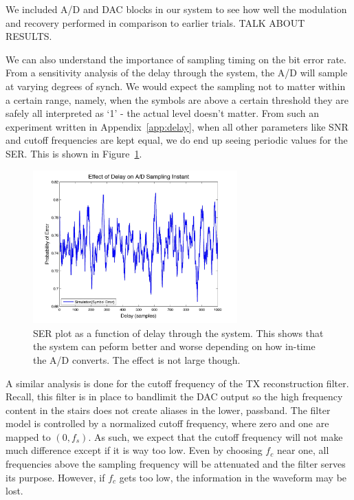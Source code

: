 \documentclass[]{article}
\begin{document}
We included A/D and DAC blocks in our system to see how well the modulation and recovery performed in comparison to earlier trials.  TALK ABOUT RESULTS.

We can also understand the importance of sampling timing on the bit error rate.  From a sensitivity analysis of the delay through the system, the A/D will sample at varying degrees of synch.  We would expect the sampling not to matter within a certain range, namely, when the symbols are above a certain threshold they are safely all interpreted as `1' - the actual level doesn't matter.  From such an experiment written in Appendix~\ref{app:delay}, when all other parameters like SNR and cutoff frequencies are kept equal, we do end up seeing periodic values for the SER.  This is shown in Figure~\ref{fig:delay}.\\

\begin{figure}[H]
\centering
\hspace*{-2cm}\includegraphics[width=0.7\textwidth]{delaySensitivity.jpg}
\caption{SER plot as a function of delay through the system.  This shows that the system can peform better and worse depending on how in-time the A/D converts.  The effect is not large though. \label{fig:delay}}
\end{figure}

A similar analysis is done for the cutoff frequency of the TX reconstruction filter.   Recall, this filter is in place to bandlimit the DAC output so the high frequency content in the stairs does not create aliases in the lower, passband.  The filter model is controlled by a normalized cutoff frequency, where zero and one are mapped to $\left(0,f_s\right)$.  As such, we expect that the cutoff frequency will not make much difference except if it is way too low.  Even by choosing $f_c$ near one, all frequencies above the sampling frequency will be attenuated and the filter serves its purpose.  However, if $f_c$ gets too low, the information in the waveform may be lost.   \\
\end{document}
